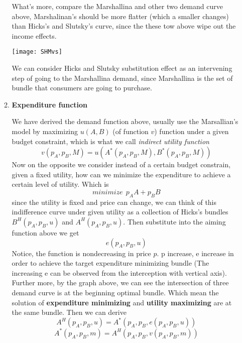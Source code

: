 \documentclass[10pt]{article}
\newenvironment{changemargin}[2]{%
  \begin{list}{}{%
    \setlength{\topsep}{0pt}%
    \setlength{\leftmargin}{#1}%
    \setlength{\rightmargin}{#2}%
    \setlength{\listparindent}{\parindent}%
    \setlength{\itemindent}{\parindent}%
    \setlength{\parsep}{\parskip}%
  }%
  \item[]}{\end{list}}
\begin{document}
\begin{changemargin}{-0.125in}{0in}
\begin{enumerate}
\begin{enumerate}
                     What's more, compare the Marshallina and other two demand curve above, Marshalinan's should be more flatter (which a smaller changes) than Hicks's and Slutsky's curve, since the these tow above wipe out the income effects.
                     
                     \begin{center}
                     	\texttt{[image: SHMvs]}
                     \end{center}
                     
                     \smallskip
                     
                      We can consider Hicks and Slutsky substitution effect as an intervening step of going to the Marshallina demand, since Marshallina is the set of bundle that consumers are going to purchase.
                     
                     \smallskip
                     
                     
                  \item 
                  \textbf{Expenditure function}
                  
                  \smallskip

                   We have derived the demand function above, usually use the Marsallian's model by maximizing $u(A,B)$ (of function $v$) function under a given budget constraint, which is what we call \textit{indirect utility function}
                   \[
                   v(p_A,p_B,M) = u(A^*(p_A,p_B,M),B^*(p_A,p_B,M))
                   \]
                   Now on the opposite we consider instead of a certain budget constrain, given a fixed utility, how can we minimize the expenditure to achieve a certain level of utility. Which is 
                   \[
                   minimize\:\:p_AA+p_BB
                   \]
                   since the utility is fixed and price can change, we can think of this indifference curve under given utility as a collection of Hicks's bundles $B^H(p_A,p_B,u)$ and $A^H(p_A,p_B,u)$. Then substitute into the aiming function above we get 
                   \[
                   e(p_A,p_B,u)
                   \]
                   Notice, the function is nondecreasing in price $p$. p increase, e increase in order to achieve the target expenditure minimizing bundle (The increasing e can be observed from the interception with vertical axis). Further more, by the graph above, we can see the intersection of three demand curve is at the beginning optimal bundle. Which mean the solution of \textbf{expenditure minimizing} and \textbf{utility maximizing} are at the same bundle. Then we can derive 
                   \[
                   A^H(p_A,p_B,u) = A^*(p_A,p_B,e(p_A,p_B,u))
                   \]
                   \[
                   A^*(p_A,p_B,m) = A^H(p_A,p_B,v(p_A,p_B,m))
                   \]
                   

\end{enumerate}
\end{enumerate}
\end{changemargin}
\end{document}
